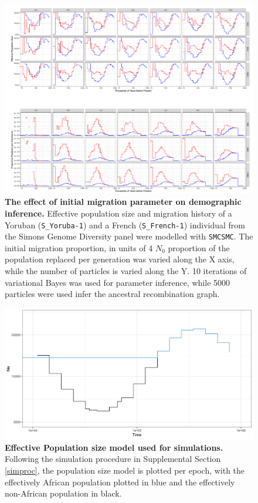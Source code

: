 \documentclass{article}
\begin{document}
\begin{figure}
	\centering
	\includegraphics[width=\textwidth]{plot/yri_dif_migs.pdf}
	\caption{ {\bf The effect of initial migration parameter on demographic inference.} Effective population size and migration history of a Yoruban ({\tt S\_Yoruba-1}) and a French ({\tt S\_French-1}) individual from the Simons Genome Diversity panel were modelled with {\tt SMCSMC}. The initial migration proportion, in units of 4 $N_0$ proportion of the population replaced per generation was varied along the X axis, while the number of particles is varied along the Y. 10 iterations of variational Bayes was used for parameter inference, while 5000 particles were used infer the ancestral recombination graph.}
	\label{init_yri}
\end{figure}

\begin{figure}[hb]
    \centering
    \includegraphics[width = 0.5\linewidth]{plot/demographic_model.png}
    \caption{{\bf Effective Population size model used for simulations.} Following the simulation procedure in Supplemental Section \ref{simproc}, the population size model is plotted per epoch, with the effectively African population plotted in blue and the effectively non-African population in black. }
    \label{fig:dem}
\end{figure}
\end{document}
